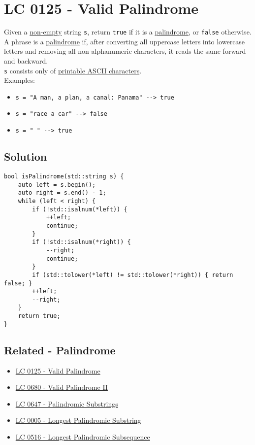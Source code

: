 \section{LC 0125 - Valid Palindrome}\label{lc0125}
Given a \ul{non-empty} string {\colorbox{CodeBackground}{\lstinline|s|}}, return {\colorbox{CodeBackground}{\lstinline|true|}} if it is a \ul{palindrome}, or {\colorbox{CodeBackground}{\lstinline|false|}} otherwise.\\

A phrase is a \ul{palindrome} if, after converting all uppercase letters into lowercase letters and removing all non-alphanumeric characters, it reads the same forward and backward.\\

{\colorbox{CodeBackground}{\lstinline|s|}} consists only of \ul{printable ASCII characters}.\\

Examples:
\begin{itemize}
\item {\colorbox{CodeBackground}{\lstinline|s = "A man, a plan, a canal: Panama" --> true|}}
\item {\colorbox{CodeBackground}{\lstinline|s = "race a car" --> false|}}
\item {\colorbox{CodeBackground}{\lstinline|s = " " --> true|}}
\end{itemize}

\subsection*{Solution}
\begin{lstlisting}
bool isPalindrome(std::string s) {
	auto left = s.begin();
	auto right = s.end() - 1;
	while (left < right) {
		if (!std::isalnum(*left)) {
			++left;
			continue;
		}
		if (!std::isalnum(*right)) {
			--right;
			continue;
		}
		if (std::tolower(*left) != std::tolower(*right)) { return false; }
		++left;
		--right;
	}
	return true;
}
\end{lstlisting}

\subsection*{Related - Palindrome}
\begin{itemize}
	\item \hyperref[lc0125]{LC 0125 - Valid Palindrome}
 	\item \hyperref[lc0680]{LC 0680 - Valid Palindrome II}
	\item \hyperref[lc0647]{LC 0647 - Palindromic Substrings}
	\item \hyperref[lc0005]{LC 0005 - Longest Palindromic Substring}
	\item \hyperref[lc0516]{LC 0516 - Longest Palindromic Subsequence}
\end{itemize}

